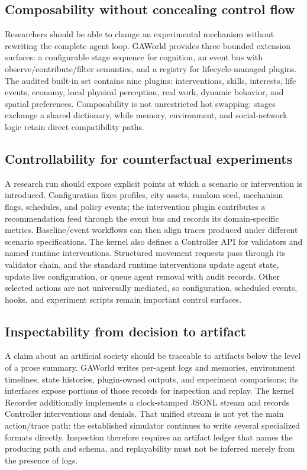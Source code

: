 \subsection{Composability without concealing control flow}

Researchers should be able to change an experimental mechanism without
rewriting the complete agent loop.  GAWorld provides three bounded extension
surfaces: a configurable stage sequence for cognition, an event bus with
observe/contribute/filter semantics, and a registry for lifecycle-managed
plugins.  The audited built-in set contains nine plugins: interventions,
skills, interests, life events, economy, local physical perception, real work,
dynamic behavior, and spatial preferences.  Composability is not unrestricted
hot swapping: stages exchange a shared dictionary, while memory, environment,
and social-network logic retain direct compatibility paths.

\subsection{Controllability for counterfactual experiments}

A research run should expose explicit points at which a scenario or
intervention is introduced.  Configuration fixes profiles, city assets,
random seed, mechanism flags, schedules, and policy events; the intervention
plugin contributes a recommendation feed through the event bus and records
its domain-specific metrics.  Baseline/event workflows can then align traces
produced under different scenario specifications.  The kernel also defines a
Controller API for validators and named runtime interventions.  Structured
movement requests pass through its validator chain, and the standard runtime
interventions update agent state, update live configuration, or queue agent
removal with audit records.  Other selected actions are not universally
mediated, so configuration, scheduled events, hooks, and experiment scripts
remain important control surfaces.

\subsection{Inspectability from decision to artifact}

A claim about an artificial society should be traceable to artifacts below the
level of a prose summary.  GAWorld writes per-agent logs and memories,
environment timelines, state histories, plugin-owned outputs, and experiment
comparisons; its interfaces expose portions of those records for inspection
and replay.  The kernel Recorder additionally implements a clock-stamped JSONL
stream and records Controller interventions and denials.  That unified stream
is not yet the main action/trace path: the established simulator continues to
write several specialized formats directly.  Inspection therefore requires
an artifact ledger that names the producing path and schema, and replayability
must not be inferred merely from the presence of logs.

